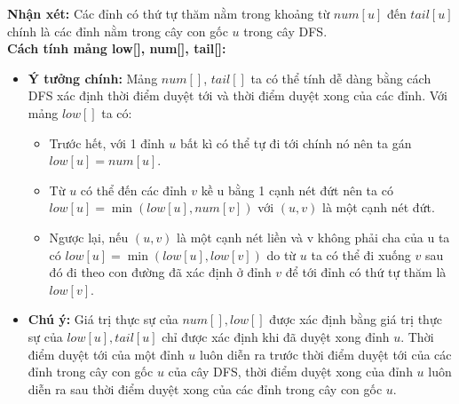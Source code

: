 \documentclass{article}
\begin{document}
\noindent\textbf{Nhận xét:} Các đỉnh có thứ tự thăm nằm trong khoảng từ $num[u]$ đến $tail[u]$ chính là các đỉnh nằm trong cây con gốc $u$ trong cây DFS.\\

\textbf{Cách tính mảng low[], num[], tail[]:}

\begin{itemize}
    \item \textbf{Ý tưởng chính:} Mảng $num[]$, $tail[]$ ta có thể tính dễ dàng bằng cách DFS xác định thời điểm duyệt tới và thời điểm duyệt xong của các đỉnh. Với mảng $low[]$ ta có:
    \begin{itemize}
        \item Trước hết, với 1 đỉnh $u$ bất kì có thể tự đi tới chính nó nên ta gán $low[u] = num[u]$.
        \item Từ $u$ có thể đến các đỉnh $v$ kề u bằng 1 cạnh nét đứt nên ta có $low[u] = \min(low[u], num[v])$ với $(u, v)$ là một cạnh nét đứt.
        \item Ngược lại, nếu $(u, v)$ là một cạnh nét liền và v không phải cha của u ta có $low[u] = \min(low[u], low[v])$ do từ $u$ ta có thể đi xuống $v$ sau đó đi theo con đường đã xác định ở đỉnh $v$ để tới đỉnh có thứ tự thăm là $low[v]$.
    \end{itemize}
    \item \textbf{Chú ý:} Giá trị thực sự của $num[], low[]$ được xác định bằng giá trị thực sự của $low[u], tail[u]$ chỉ được xác định khi đã duyệt xong đỉnh $u$. Thời điểm duyệt tới của một đỉnh $u$ luôn diễn ra trước thời điểm duyệt tới của các đỉnh trong cây con gốc $u$ của cây DFS, thời điểm duyệt xong của đỉnh $u$ luôn diễn ra sau thời điểm duyệt xong của các đỉnh trong cây con gốc $u$.


\end{itemize}
\end{document}
